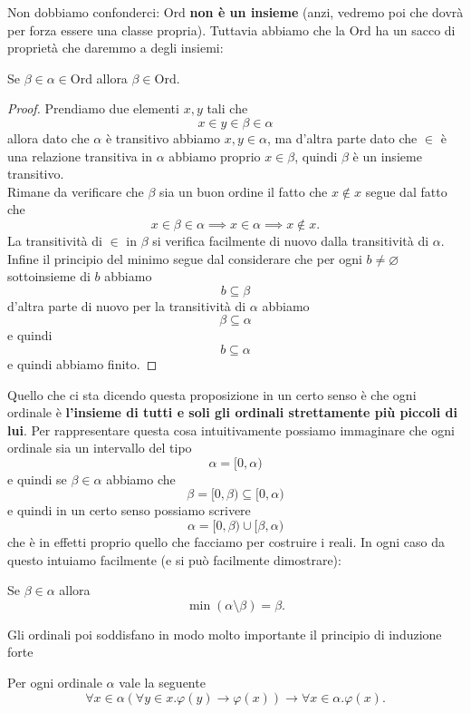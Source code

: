 \documentclass[11pt]{scrartcl}
\newcommand{\eset}{\varnothing}
\begin{document}
 	Non dobbiamo confonderci: $\text{Ord}$ \textbf{non è un insieme } (anzi, vedremo poi che dovrà per forza essere una classe propria). Tuttavia abbiamo che la $\text{Ord}$ ha un sacco di proprietà che daremmo a degli insiemi:
 	\begin{proposition}
 		Se $\beta\in \alpha\in \text{Ord}$ allora $\beta\in \text{Ord}$.
 	\end{proposition}
 	\begin{proof}
 		Prendiamo due elementi $x,y$ tali che
 		$$x\in y \in \beta\in \alpha$$
 		allora dato che $\alpha$ è transitivo abbiamo $x,y\in \alpha$, ma d'altra parte dato che $\in$ è una relazione transitiva in $\alpha$ abbiamo proprio $x\in \beta$, quindi $\beta$ è un insieme transitivo. \\
 		Rimane da verificare che $\beta$ sia un buon ordine il fatto che $x\not\in x$ segue dal fatto che 
 		$$x\in \beta \in \alpha \implies x\in \alpha \implies x\not \in x.$$
 		La transitività di $\in$ in $\beta$ si verifica facilmente di nuovo dalla transitività di $\alpha$. Infine il principio del minimo segue dal considerare che per ogni $b\ne \eset$ sottoinsieme di $b$ abbiamo
 		$$b\subseteq \beta$$
 		d'altra parte di nuovo per la transitività di $\alpha$ abbiamo 
 		$$\beta\subseteq\alpha$$
 		e quindi 
 		$$b\subseteq \alpha$$
 		e quindi abbiamo finito.
 	\end{proof}
 	Quello che ci sta dicendo questa proposizione in un certo senso è che ogni ordinale è \textbf{l'insieme di tutti e soli gli ordinali strettamente più piccoli di lui}. Per rappresentare questa cosa intuitivamente possiamo immaginare che ogni ordinale sia un intervallo del tipo
 	$$\alpha=[0,\alpha)$$
 	e quindi se $\beta\in \alpha$ abbiamo che
 	$$\beta=[0,\beta)\subseteq [0,\alpha)$$
 	e quindi in un certo senso possiamo scrivere
 	$$\alpha=[0,\beta)\cup [\beta,\alpha)$$
 	che è in effetti proprio quello che facciamo per costruire i reali. In ogni caso da questo intuiamo facilmente (e si può facilmente dimostrare):
 	\begin{proposition}
 		Se $\beta\in \alpha$ allora
 		$$\min(\alpha\setminus \beta)=\beta.$$
 	\end{proposition}
 	Gli ordinali poi soddisfano in modo molto importante il principio di induzione forte
 	\begin{proposition}
 		Per ogni ordinale $\alpha$ vale la seguente
 		$$\forall x\in\alpha\left(\forall y\in x.\varphi(y)\to \varphi(x)\right)\to \forall x\in \alpha. \varphi(x).$$
 	\end{proposition}
\end{document}
